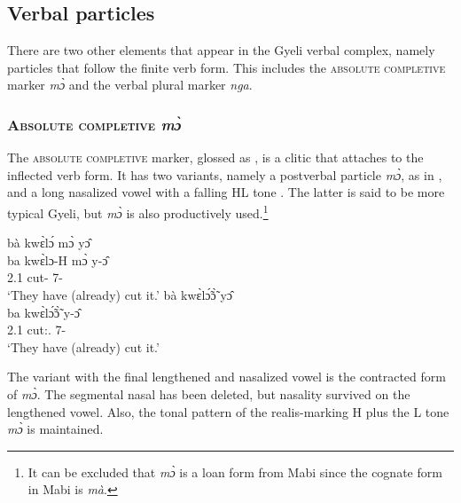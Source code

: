 









\subsection{Verbal particles}
\label{sec:VParticle}

There are two other elements that appear in the Gyeli verbal complex, namely particles that follow the finite verb form. This includes the \textsc{absolute completive} marker {\itshape mɔ̀} and the verbal plural marker {\itshape nga}.

\subsubsection{\textsc{Absolute completive} {\itshape mɔ̀}}
\label{sec:mo}

The \textsc{absolute completive} marker, glossed as {\COMPL}, is a clitic that attaches to the inflected verb form. It has two variants, namely a postverbal particle {\itshape mɔ̀}, as in , and a long nasalized vowel with a falling HL tone . The latter is said to be more typical Gyeli, but {\itshape mɔ̀} is also productively used.\footnote{It can be excluded that {\itshape mɔ̀} is a loan form from Mabi since the cognate form in Mabi is {\itshape mà}.}


\ea \label{absmo1}
\ea\label{absmo1a}
  \glll    bà kwɛ̀lɔ́ mɔ̀ yɔ̂  \\
           ba kwɛ̀lɔ-H mɔ̀  y-ɔ̂ \\
             2.{\PST}1  cut-{\R} {\COMPL} 7-{\OBJ}  \\
    \trans `They have (already) cut it.'
\ex\label{absmo1b}
  \glll    bà kwɛ̀lɔ̃́ɔ̃̀ yɔ̂ \\
          ba kwɛ̀lɔ̃́ɔ̃̀ y-ɔ̂   \\
             2.{\PST}1 cut:{\COMPL}.{\R} 7-{\OBJ}    \\
    \trans `They have (already) cut it.'
\z
\z

\noindent The variant with the final lengthened and nasalized vowel is the contracted form of {\itshape mɔ̀}. The segmental nasal has been deleted, but nasality survived on the lengthened vowel. Also, the tonal pattern of the realis-marking H plus the L tone {\itshape mɔ̀} is maintained.

